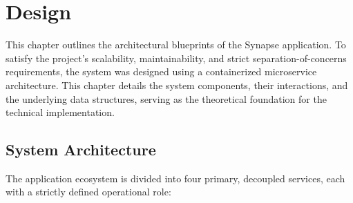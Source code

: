 \section{Design} \label{sec:design}
This chapter outlines the architectural blueprints of the Synapse application. To satisfy the project's scalability, maintainability, and strict separation-of-concerns requirements, the system was designed using a containerized microservice architecture. This chapter details the system components, their interactions, and the underlying data structures, serving as the theoretical foundation for the technical implementation.

\subsection{System Architecture}
The application ecosystem is divided into four primary, decoupled services, each with a strictly defined operational role:


